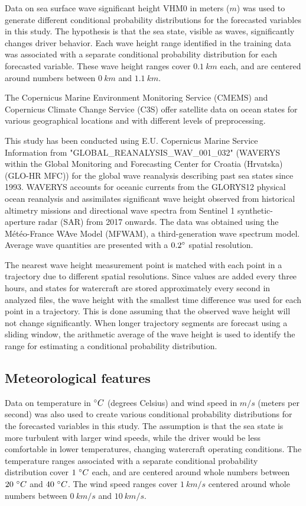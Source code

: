 \documentclass[preprint,12pt]{elsarticle}
\begin{document}
Data on sea surface wave significant height VHM0 in meters ($m$) was used to generate different conditional probability distributions for the forecasted variables in this study. The hypothesis is that the sea state, visible as waves, significantly changes driver behavior. Each wave height range identified in the training data was associated with a separate conditional probability distribution for each forecasted variable. These wave height ranges cover $0.1 \ km$ each, and are centered around numbers between $0 \ km$ and $1.1 \ km$.

The Copernicus Marine Environment Monitoring Service (CMEMS) and Copernicus Climate Change Service (C3S) offer satellite data on ocean states for various geographical locations and with different levels of preprocessing.

This study has been conducted using E.U. Copernicus Marine Service Information from "GLOBAL\_REANALYSIS\_WAV\_001\_032" \cite{https://doi.org/10.48670/moi-00022} (WAVERYS within the Global Monitoring and Forecasting Center for Croatia (Hrvatska) (GLO-HR MFC)) for the global wave reanalysis describing past sea states since 1993. WAVERYS accounts for oceanic currents from the GLORYS12 physical ocean reanalysis and assimilates significant wave height observed from historical altimetry missions and directional wave spectra from Sentinel 1 synthetic-aperture radar (SAR) from 2017 onwards. The data was obtained using the Météo-France WAve Model (MFWAM), a third-generation wave spectrum model. Average wave quantities are presented with a $0.2\degree$ spatial resolution.

The nearest wave height measurement point is matched with each point in a trajectory due to different spatial resolutions. Since values are added every three hours, and states for watercraft are stored approximately every second in analyzed files, the wave height with the smallest time difference was used for each point in a trajectory. This is done assuming that the observed wave height will not change significantly. When longer trajectory segments are forecast using a sliding window, the arithmetic average of the wave height is used to identify the range for estimating a conditional probability distribution.

\subsection{Meteorological features}

Data on temperature in $\degree C$ (degrees Celsius) and wind speed in $m/s$ (meters per second) was also used to create various conditional probability distributions for the forecasted variables in this study. The assumption is that the sea state is more turbulent with larger wind speeds, while the driver would be less comfortable in lower temperatures, changing watercraft operating conditions. The temperature ranges associated with a separate conditional probability distribution cover $1 \ \degree C$ each, and are centered around whole numbers between $20 \ \degree C$ and $40 \ \degree C$. The wind speed ranges cover $1 \ km/s$ centered around whole numbers between $0 \ km/s$ and $10 \ km/s$.
\end{document}
